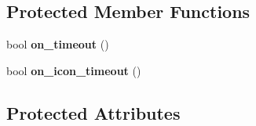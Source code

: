 \subsection*{\-Protected \-Member \-Functions}
\begin{DoxyCompactItemize}
\item 
\hypertarget{classinstSendWidget_ac53faceafc5c474f13f792a8c662acf8}{bool {\bfseries on\-\_\-timeout} ()}\label{classinstSendWidget_ac53faceafc5c474f13f792a8c662acf8}

\item 
\hypertarget{classinstSendWidget_ad9cfe9674c8ce25e2b6d97909559f747}{bool {\bfseries on\-\_\-icon\-\_\-timeout} ()}\label{classinstSendWidget_ad9cfe9674c8ce25e2b6d97909559f747}

\end{DoxyCompactItemize}
\subsection*{\-Protected \-Attributes}
